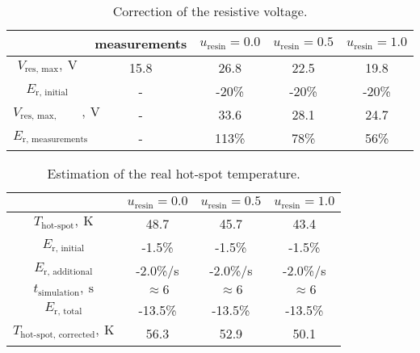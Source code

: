 \begin{table}[H]
    \caption{Correction of the resistive voltage.} 
    \vspace{-1.em} 
    \fontsize{10}{10}
    \selectfont 
    \renewcommand{\arraystretch}{1.5}
    \begin{center}
        \begin{tabular}{ | c | c | c | c | c | }  
        \hline
         & measurements & $u_\text{resin}=0.0$ & $u_\text{resin}=0.5$ & $u_\text{resin}=1.0$ \\
        \hline
        $V_\text{res, max},~\text{V}$ & 15.8 & 26.8 & 22.5 & 19.8 \\
        $E_\text{r, initial}$ & - & -20\% & -20\% & -20\% \\
        $V_\text{res, max, corrected},~\text{V}$ & - & 33.6 & 28.1 & 24.7 \\
        \hline 
        $E_\text{r, measurements}$ & - & 113\% & 78\% & 56\% \\
        \hline 
        \end{tabular}
    \end{center}  
     \label{table: skew_quad_general_remarks_res_voltage} 
\end{table}

\begin{table}[H]
    \caption{Estimation of the real hot-spot temperature.} 
    \vspace{-1.em} 
    \fontsize{10}{10}
    \selectfont 
    \renewcommand{\arraystretch}{1.5}
    \begin{center}
        \begin{tabular}{ | c | c | c | c | }  
        \hline
         & $u_\text{resin}=0.0$ & $u_\text{resin}=0.5$ & $u_\text{resin}=1.0$ \\
        \hline
        $T_\text{hot-spot},~\text{K}$ & 48.7 & 45.7 & 43.4 \\
        $E_\text{r, initial}$ & -1.5\% & -1.5\% & -1.5\% \\
        $E_\text{r, additional}$ & -2.0\%/s & -2.0\%/s & -2.0\%/s \\
        $t_\text{simulation},~\text{s}$ & $\approx 6$ & $\approx 6$ & $\approx 6$ \\
        $E_\text{r, total}$ & -13.5\% & -13.5\% & -13.5\% \\
        $T_\text{hot-spot, corrected},~\text{K}$ & 56.3 & 52.9 & 50.1 \\
        \hline 
        \end{tabular}
    \end{center}  
     \label{table: skew_quad_general_remarks_hot_spot} 
\end{table}

